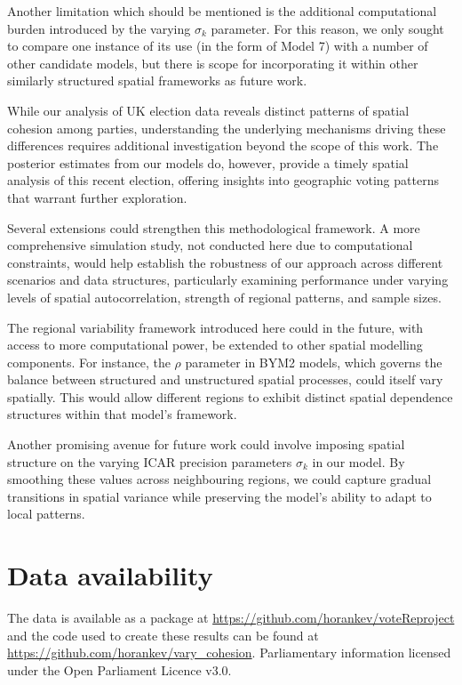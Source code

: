 \documentclass[webpdf,large,contemporary,namedate]{oup-authoring-template}
\theoremstyle{thmstyleone}
\theoremstyle{thmstyletwo}
\theoremstyle{thmstylethree}
\begin{document}
Another limitation which should be mentioned is the additional
computational burden introduced by the varying \(\sigma_k\) parameter.
For this reason, we only sought to compare one instance of its use (in
the form of Model 7) with a number of other candidate models, but there
is scope for incorporating it within other similarly structured spatial
frameworks as future work.

While our analysis of UK election data reveals distinct patterns of
spatial cohesion among parties, understanding the underlying mechanisms
driving these differences requires additional investigation beyond the
scope of this work. The posterior estimates from our models do, however,
provide a timely spatial analysis of this recent election, offering
insights into geographic voting patterns that warrant further
exploration.

Several extensions could strengthen this methodological framework. A
more comprehensive simulation study, not conducted here due to
computational constraints, would help establish the robustness of our
approach across different scenarios and data structures, particularly
examining performance under varying levels of spatial autocorrelation,
strength of regional patterns, and sample sizes.

The regional variability framework introduced here could in the future,
with access to more computational power, be extended to other spatial
modelling components. For instance, the \(\rho\) parameter in BYM2
models, which governs the balance between structured and unstructured
spatial processes, could itself vary spatially. This would allow
different regions to exhibit distinct spatial dependence structures
within that model's framework.

Another promising avenue for future work could involve imposing spatial
structure on the varying ICAR precision parameters \(\sigma_k\) in our
model. By smoothing these values across neighbouring regions, we could
capture gradual transitions in spatial variance while preserving the
model's ability to adapt to local patterns.

\section{Data availability}\label{data-availability}

The data is available as a package at
\url{https://github.com/horankev/voteReproject} and the code used to
create these results can be found at
\url{https://github.com/horankev/vary_cohesion}. Parliamentary
information licensed under the Open Parliament Licence v3.0.
\end{document}
